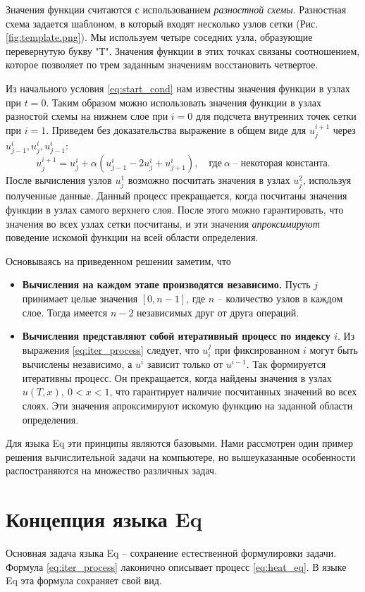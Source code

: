 \documentclass[a4paper]{llncs}
\begin{document}
Значения функции считаются с использованием \emph{разностной схемы}. Разностная схема задается шаблоном, в который входят несколько узлов сетки (Рис. \ref{fig:template.png}). Мы используем четыре соседних узла, образующие перевернутую букву "Т". Значения функции в этих точках связаны соотношением, которое позволяет по трем заданным значениям восстановить четвертое.

Из начального условия \eqref{eq:start_cond} нам известны значения функции в узлах при $t=0$. Таким образом можно использовать значения функции в узлах разностой схемы на нижнем слое при $i=0$ для подсчета внутренних точек сетки при $i=1$. Приведем без доказательства выражение в общем виде для $u^{i+1}_j$ через $u^i_{j-1}, u^i_j, u^i_{j-1}$:
\begin{equation}
\label{eq:iter_process}
u^{i+1}_j  = u^i_j + \alpha(u^i_{j-1} - 2u^i_j + u^i_{j+1}),\quad \textrm{где}\ \alpha\  \textrm{-- некоторая константа.}
\end{equation}
После вычисления узлов $u^1_j$ возможно посчитать значения в узлах $u^2_j$, используя полученные  данные. Данный процесс прекращается, когда посчитаны значения функции в узлах самого верхнего слоя. После этого можно гарантировать, что значения во всех узлах сетки посчитаны, и эти значения \emph{апроксимируют} поведение искомой функции на всей области определения.

Основываясь на приведенном решении заметим, что
\begin{itemize}
	\item \textbf{Вычисления на каждом этапе производятся независимо.} Пусть $j$ принимает целые значения $[0, n-1]$, где $n$ -- количество узлов в каждом слое. Тогда имеется $n-2$ независимых друг от друга операций.
	\item \textbf{Вычисления представляют собой итеративный процесс по индексу $i$}. Из выражения \eqref{eq:iter_process} следует, что $u_i^j$ при фиксированном $i$ могут быть вычислены независимо, а $u^i$ зависит только от $u^{i-1}$. Так формируется итеративны процесс. Он прекращается, когда найдены значения в узлах $u(T, x),\ 0<x<1$, что гарантирует наличие посчитанных значений во всех слоях. Эти значения апроксимируют искомую функцию на заданной области определения.
\end{itemize}
Для языка Eq эти принципы являются базовыми. Нами рассмотрен один пример решения вычислительной задачи на компьютере, но вышеуказанные особенности распостраняются на множество различных задач.

\section*{Концепция языка Eq}
Основная задача языка Eq -- сохранение естественной формулировки задачи. Формула \eqref{eq:iter_process} лаконично описывает процесс \eqref{eq:heat_eq}. В языке Eq эта формула сохраняет свой вид. 
\end{document}
